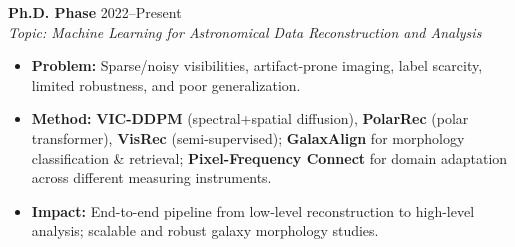 \documentclass[letterpaper,10pt]{article}
\begin{document}
\begin{CJK}{UTF8}{gbsn}


    

\textbf{Ph.D. Phase} \hfill 2022--Present \\
\emph{Topic: Machine Learning for Astronomical Data Reconstruction and Analysis}
\begin{itemize}
  \item \textbf{Problem:} Sparse/noisy visibilities, artifact-prone imaging, label scarcity, limited robustness, and poor generalization.
  \item \textbf{Method:} \textbf{VIC-DDPM} (spectral+spatial diffusion), \textbf{PolarRec} (polar transformer), \textbf{VisRec} (semi-supervised); \textbf{GalaxAlign} for morphology classification \& retrieval; \textbf{Pixel-Frequency Connect} for domain adaptation across different measuring instruments.
  \item \textbf{Impact:} End-to-end pipeline from low-level reconstruction to high-level analysis; scalable and robust galaxy morphology studies.
\end{itemize}


\end{CJK}
\end{document}
